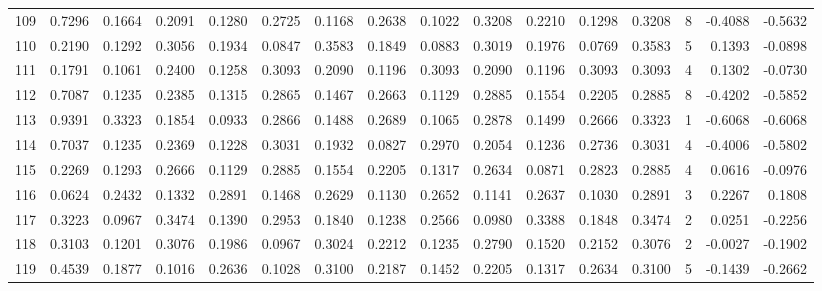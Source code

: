 \begin{tabular}{lrrrrrrrrrrrrrrr}
109 &      0.7296 &  0.1664 &  0.2091 &  0.1280 &  0.2725 &  0.1168 &  0.2638 &  0.1022 &  0.3208 &  0.2210 &   0.1298 &     0.3208 &      8 &                   -0.4088 &                    -0.5632 \\
110 &      0.2190 &  0.1292 &  0.3056 &  0.1934 &  0.0847 &  0.3583 &  0.1849 &  0.0883 &  0.3019 &  0.1976 &   0.0769 &     0.3583 &      5 &                    0.1393 &                    -0.0898 \\
111 &      0.1791 &  0.1061 &  0.2400 &  0.1258 &  0.3093 &  0.2090 &  0.1196 &  0.3093 &  0.2090 &  0.1196 &   0.3093 &     0.3093 &      4 &                    0.1302 &                    -0.0730 \\
112 &      0.7087 &  0.1235 &  0.2385 &  0.1315 &  0.2865 &  0.1467 &  0.2663 &  0.1129 &  0.2885 &  0.1554 &   0.2205 &     0.2885 &      8 &                   -0.4202 &                    -0.5852 \\
113 &      0.9391 &  0.3323 &  0.1854 &  0.0933 &  0.2866 &  0.1488 &  0.2689 &  0.1065 &  0.2878 &  0.1499 &   0.2666 &     0.3323 &      1 &                   -0.6068 &                    -0.6068 \\
114 &      0.7037 &  0.1235 &  0.2369 &  0.1228 &  0.3031 &  0.1932 &  0.0827 &  0.2970 &  0.2054 &  0.1236 &   0.2736 &     0.3031 &      4 &                   -0.4006 &                    -0.5802 \\
115 &      0.2269 &  0.1293 &  0.2666 &  0.1129 &  0.2885 &  0.1554 &  0.2205 &  0.1317 &  0.2634 &  0.0871 &   0.2823 &     0.2885 &      4 &                    0.0616 &                    -0.0976 \\
116 &      0.0624 &  0.2432 &  0.1332 &  0.2891 &  0.1468 &  0.2629 &  0.1130 &  0.2652 &  0.1141 &  0.2637 &   0.1030 &     0.2891 &      3 &                    0.2267 &                     0.1808 \\
117 &      0.3223 &  0.0967 &  0.3474 &  0.1390 &  0.2953 &  0.1840 &  0.1238 &  0.2566 &  0.0980 &  0.3388 &   0.1848 &     0.3474 &      2 &                    0.0251 &                    -0.2256 \\
118 &      0.3103 &  0.1201 &  0.3076 &  0.1986 &  0.0967 &  0.3024 &  0.2212 &  0.1235 &  0.2790 &  0.1520 &   0.2152 &     0.3076 &      2 &                   -0.0027 &                    -0.1902 \\
119 &      0.4539 &  0.1877 &  0.1016 &  0.2636 &  0.1028 &  0.3100 &  0.2187 &  0.1452 &  0.2205 &  0.1317 &   0.2634 &     0.3100 &      5 &                   -0.1439 &                    -0.2662 \\

\end{tabular}

